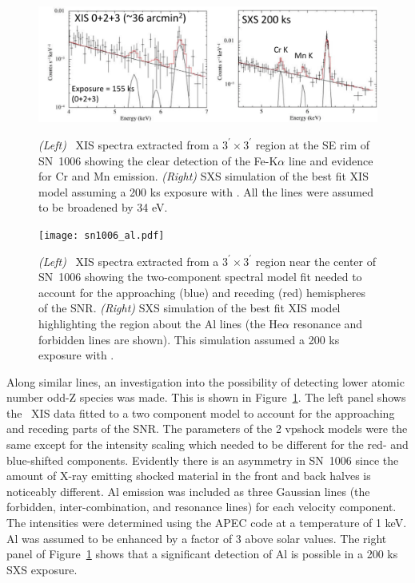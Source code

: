 \documentclass[11pt,a4paper]{article}
\begin{document}
{\begin{figure}
  \begin{center}
     \includegraphics[width=0.9\hsize]{sn1006_MnCr.pdf}
  \caption{{\it (Left)} \suzaku\ XIS spectra extracted from a
    $3^\prime \times 3^\prime$ region at the SE rim of SN~1006 showing
    the clear detection of the Fe-K$\alpha$ line and evidence for Cr
    and Mn emission. {\it (Right)} SXS simulation of the best fit XIS
    model assuming a 200 ks exposure with \ah. All the lines were
    assumed to be broadened by 34 eV. }
  \label{sn1006:cmncr}
  \end{center}
  \begin{center}
    \vspace{-0.01in}
     \texttt{[image: sn1006\_al.pdf]}
  \caption{{\it (Left)} \suzaku\ XIS spectra extracted from a
    $3^\prime \times 3^\prime$ region near the center of SN~1006
    showing the two-component spectral model fit needed to account for
    the approaching (blue) and receding (red) hemispheres of the SNR.
    {\it (Right)} SXS simulation of the best fit XIS model
    highlighting the region about the Al lines (the He$\alpha$
    resonance and forbidden lines are shown).  This simulation assumed
    a 200 ks exposure with \ah. }
  \label{sn1006:al}
  \end{center}
\end{figure}


Along similar lines, an investigation into the possibility of
detecting lower atomic number odd-Z species was made.  This is shown
in Figure~\ref{sn1006:al}.  The left panel shows the \suzaku\ XIS data
fitted to a two component model to account for the approaching and
receding parts of the SNR. The parameters of the 2 vpshock models were
the same except for the intensity scaling which needed to be different
for the red- and blue-shifted components. Evidently there is an
asymmetry in SN~1006 since the amount of X-ray emitting shocked
material in the front and back halves is noticeably different. Al
emission was included as three Gaussian lines (the forbidden,
inter-combination, and resonance lines) for each velocity
component. The intensities were determined using the APEC code at a
temperature of 1 keV.  Al was assumed to be enhanced by a factor of 3
above solar values.  The right panel of Figure~\ref{sn1006:al} shows
that a significant detection of Al is possible in a 200 ks SXS
exposure.

}
\end{document}
